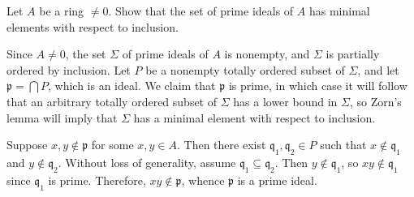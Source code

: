 \begin{exercise}
Let \(A\) be a ring \(\neq 0\).
Show that the set of prime ideals of \(A\) has minimal elements with respect to inclusion.
\end{exercise}

\begin{solution}
Since \(A \neq 0\), the set \(\Sigma\) of prime ideals of \(A\) is nonempty, and \(\Sigma\) is partially ordered by inclusion.
Let \(P\) be a nonempty totally ordered subset of \(\Sigma\), and let \(\mathfrak p = \bigcap P\), which is an ideal.
We claim that \(\mathfrak{p}\) is prime, in which case it will follow that an arbitrary totally ordered subset of \(\Sigma\) has a lower bound in \(\Sigma\), so Zorn's lemma will imply that \(\Sigma\) has a minimal element with respect to inclusion.

Suppose \(x, y \notin \mathfrak p\) for some \(x,y\in A\).
Then there exist \(\mathfrak q_1,\mathfrak q_2 \in P\) such that \(x \notin \mathfrak q_1\) and \(y \notin \mathfrak q_2\).
Without loss of generality, assume \(\mathfrak q_1 \subseteq \mathfrak q_2\).
Then \(y \notin \mathfrak q_1\), so \(x y \notin \mathfrak q_1\) since \(\mathfrak q_1\) is prime.
Therefore, \(x y \notin \mathfrak p\), whence \(\mathfrak p\) is a prime ideal.
\end{solution}